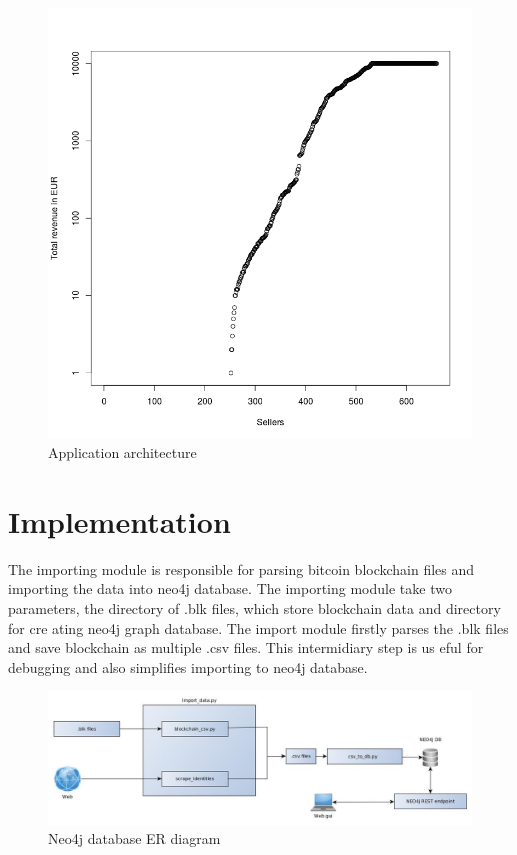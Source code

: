\documentclass[
  digital, %
  table,   %
  lof,     %
  lot,     %
  oneside
]{fithesis3}
\begin{document}
\begin{figure}[!htb]
    \centering
    \includegraphics[scale=0.4]{total-rev}
    \caption{Application architecture}
    \label{Vendors by total revenue}
\end{figure}



\section{Implementation}

The importing module is responsible for parsing bitcoin blockchain files and importing the data into neo4j database.
The importing module take two parameters, the directory of .blk files, which store blockchain data and directory for cre
ating neo4j graph database.
The import module firstly parses the .blk files and save blockchain as multiple .csv files. This intermidiary step is us
eful for debugging and also simplifies importing to neo4j database.

\begin{figure}[!htb]
    \centering
    \includegraphics[width=1\textwidth]{application_architecture}
    \caption{Neo4j database ER diagram}
    \label{application_architecture}
\end{figure}
\end{document}
